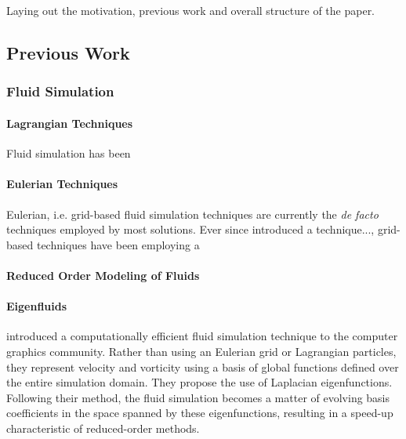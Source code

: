 \chapter{\bevezetes}

Laying out the motivation, previous work and overall structure of the paper.


\section{Previous Work}
\subsection{Fluid Simulation}
\subsubsection*{Lagrangian Techniques}
Fluid simulation has been 
\subsubsection*{Eulerian Techniques}
Eulerian, i.e. grid-based fluid simulation techniques are currently the
\textit{de facto} techniques employed by most solutions.
Ever since \todo{[cite]} introduced a technique..., grid-based techniques
have been employing a 

\subsubsection*{Reduced Order Modeling of Fluids}

\subsubsection*{Eigenfluids}

\cite{dewitt} introduced a computationally efficient fluid simulation technique
to the computer graphics community. Rather than using an Eulerian grid or
Lagrangian particles, they represent velocity and vorticity using a basis of
global functions defined over the entire simulation domain. They propose the use
of Laplacian eigenfunctions. Following their method, the fluid simulation
becomes a matter of evolving basis coefficients in the space spanned by
these eigenfunctions, resulting in a speed-up characteristic of reduced-order
methods.

